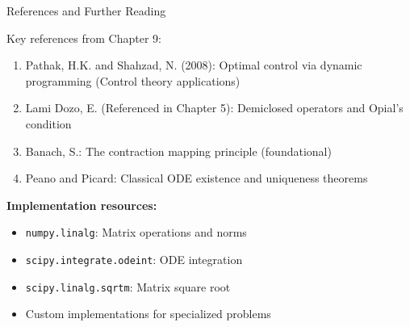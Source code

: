\documentclass[aspectratio=169,10pt]{beamer}
\begin{document}
\begin{frame}[fragile]{References and Further Reading}

Key references from Chapter 9:

\begin{enumerate}
  \item Pathak, H.K. and Shahzad, N. (2008): Optimal control via dynamic programming (Control theory applications)

  \item Lami Dozo, E. (Referenced in Chapter 5): Demiclosed operators and Opial's condition

  \item Banach, S.: The contraction mapping principle (foundational)

  \item Peano and Picard: Classical ODE existence and uniqueness theorems
\end{enumerate}

\vspace{1.5em}

\textbf{Implementation resources:}
\begin{itemize}
  \item \texttt{numpy.linalg}: Matrix operations and norms
  \item \texttt{scipy.integrate.odeint}: ODE integration
  \item \texttt{scipy.linalg.sqrtm}: Matrix square root
  \item Custom implementations for specialized problems
\end{itemize}

\end{frame}
\end{document}
